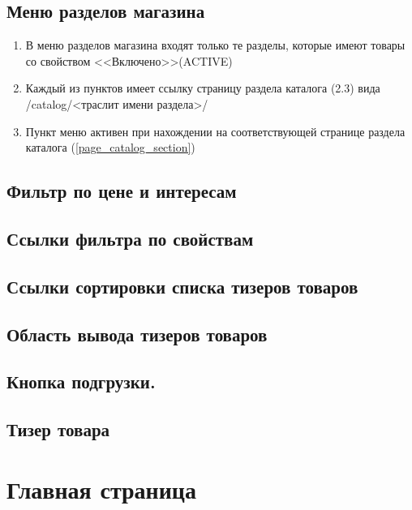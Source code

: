         \subsection{Меню разделов магазина}
            \begin{enumerate}
                \item В меню разделов магазина входят только те разделы, которые имеют товары со свойством <<Включено>>(ACTIVE)
                \item Каждый из пунктов имеет ссылку страницу раздела каталога (2.3) вида /catalog/<траслит имени раздела>/
                \item Пункт меню активен при нахождении на соответствующей странице раздела каталога (\ref{page_catalog_section})
            \end{enumerate}
        \subsection{Фильтр по цене и интересам}
            \label{baseitems_interest_filter}
        \subsection{Ссылки фильтра по свойствам}
            \label{baseitems_props_filter}
        \subsection{Ссылки сортировки списка тизеров товаров}
            \label{baseitems_goods_sort}
        \subsection{Область вывода тизеров товаров}
            \label{baseitems_goods_area}
        \subsection{Кнопка подгрузки.}
            \label{baseitems_goods_more}
        \subsection{Тизер товара}




    \section{Главная страница}


